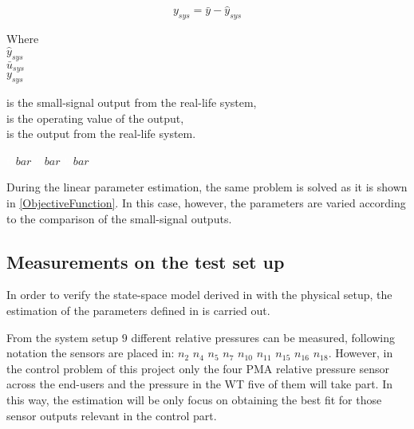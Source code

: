 \begin{equation}
  y_{sys} = \bar{y} - \hat{y}_{sys} 
 \label{u_smallsignal}
\end{equation}

\begin{minipage}[t]{0.20\textwidth}
Where\\
\hspace*{8mm} $\hat{y}_{sys}$ \\
\hspace*{8mm} $\bar{u}_{sys}$ \\
\hspace*{8mm} $y_{sys}$ 
\end{minipage}
\begin{minipage}[t]{0.68\textwidth}
\vspace*{2mm}
is the small-signal output from the real-life system, \\
is the operating value of the output,\\
is the output from the real-life system. 
\end{minipage}
\begin{minipage}[t]{0.10\textwidth}
\vspace*{2mm}
\textcolor{White}{te}$\unit{bar}$
\textcolor{White}{te}$\unit{bar}$
\textcolor{White}{te}$\unit{bar}$
\end{minipage} 

During the linear parameter estimation, the same problem is solved as it is shown in \eqref{ObjectiveFunction}. In this case, however, the parameters are varied according to the comparison of the small-signal outputs.  

\subsection{Measurements on the test set up}
\label{LinParamEst_measurements}

In order to verify the state-space model derived in  with the physical setup, the estimation of the parameters defined in 
is carried out.

From the system setup $9$ different relative pressures can be measured, following  notation the sensors are placed in: 
$n_2$ $n_4$ $n_5$ $n_7$ $n_{10}$ $n_{11}$ $n_{15}$ $n_{16}$ $n_{18}$. However, in the control problem of this project only the four PMA relative pressure 
sensor across the end-users and the pressure in the WT five of them will take part. In this way, the estimation will be only focus on obtaining the best fit for those 
sensor outputs relevant in the control part. 

